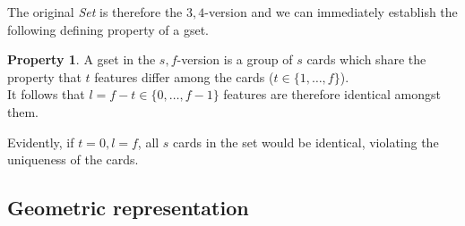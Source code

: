 \documentclass{article}
\theoremstyle{definition}
\newtheorem{prop}{Property}
\theoremstyle{remark}
\begin{document}
The original \emph{Set} is therefore the $3,4$-version and we can immediately establish the following defining property of a gset.
\begin{prop}
\label{prop:diff_feat}
    A gset in the $s,f$-version is a group of $s$ cards which share the property that $t$ features differ among the cards ($t\in\{1,\dots,f\}$).\\
    It follows that $l=f-t\in\{0,\dots,f-1\}$ features are therefore identical amongst them.
\end{prop}
Evidently, if $t=0,l=f$, all $s$ cards in the set would be identical, violating the uniqueness of the cards.

\subsection{Geometric representation}
\end{document}
